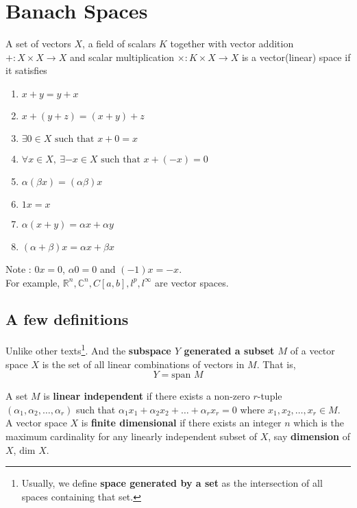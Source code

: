 \section{Banach Spaces}
\begin{definition}
	A set of vectors $X$, a field of scalars $K$ together with vector addition $+ : X \times X \to X$ and scalar multiplication $\times : K \times X \to X$ is a vector(linear) space if it satisfies
	\begin{enumerate}
		\item $x+y = y+x$
		\item $x+(y+z) = (x+y)+z$
		\item $\exists 0 \in X \text{ such that } x+0=x$
		\item $\forall x \in X,\ \exists -x \in X \text{ such that } x+(-x) = 0$
		\item $\alpha (\beta x) = (\alpha\beta)x$
		\item $1x = x$
		\item $\alpha(x+y) = \alpha x + \alpha y$
		\item $(\alpha+\beta)x = \alpha x + \beta x$
	\end{enumerate}
\end{definition}

Note : $0x = 0$, $\alpha 0 = 0$ and $(-1)x = -x$.\\

For example, $\mathbb{R}^n, \mathbb{C}^n, C[a,b], l^p, l^\infty$ are vector spaces.

\subsection{A few definitions}
Unlike other texts\dag\footnote{
	Usually, we define \textbf{space generated by a set} as the intersection of all spaces containing that set.}.
	And the \textbf{subspace $Y$ generated a subset $M$} of a vector space $X$ is the set of all linear combinations of vectors in $M$.
	That is,
	\[ Y = \text{span } M \]

A set $M$ is \textbf{linear independent} if there exists a non-zero $r$-tuple $(\alpha_1,\alpha_2,\dots,\alpha_r)$ such that $\alpha_1 x_1 + \alpha_2 x_2 + \dots + \alpha_r x_r = 0$ where $x_1,x_2,\dots,x_r \in M$.\\

A vector space $X$ is \textbf{finite dimensional} if there exists an integer $n$ which is the maximum cardinality for any linearly independent subset of $X$, say \textbf{dimension} of $X$, $\text{dim } X$.\\

